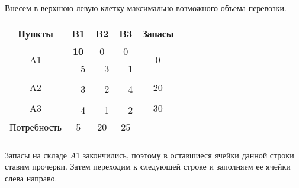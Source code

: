 \documentclass[a4paper,12pt]{article}
\begin{document}
	Внесем в верхнюю левую клетку максимально возможного объема перевозки.
	
	\begin{center}
		\begin{tabular}{cccccccc}
			\hline
			\multicolumn{1}{|c|}{Пункты} & \multicolumn{2}{c|}{B1} & \multicolumn{2}{c|}{B2} & \multicolumn{2}{c|}{B3} & \multicolumn{1}{c|}{Запасы} \\ \hline
			\multicolumn{1}{|c|}{\multirow{2}{*}{A1}} & \multicolumn{2}{c|}{\textbf{10}} & \multicolumn{2}{c|}{0} & \multicolumn{2}{c|}{0} & \multicolumn{1}{c|}{\multirow{2}{*}{0}} \\ \cline{2-7}
			\multicolumn{1}{|c|}{} & \multicolumn{1}{c|}{} & \multicolumn{1}{c|}{5} & \multicolumn{1}{c|}{} & \multicolumn{1}{c|}{3} & \multicolumn{1}{c|}{} & \multicolumn{1}{c|}{1} & \multicolumn{1}{c|}{} \\ \hline
			\multicolumn{1}{|c|}{\multirow{2}{*}{A2}} & \multicolumn{2}{c|}{} & \multicolumn{2}{c|}{} & \multicolumn{2}{c|}{} & \multicolumn{1}{c|}{\multirow{2}{*}{20}} \\ \cline{2-7}
			\multicolumn{1}{|c|}{} & \multicolumn{1}{c|}{} & \multicolumn{1}{c|}{3} & \multicolumn{1}{c|}{} & \multicolumn{1}{c|}{2} & \multicolumn{1}{c|}{} & \multicolumn{1}{c|}{4} & \multicolumn{1}{c|}{} \\ \hline
			\multicolumn{1}{|c|}{\multirow{2}{*}{A3}} & \multicolumn{2}{c|}{} & \multicolumn{2}{c|}{} & \multicolumn{2}{c|}{} & \multicolumn{1}{c|}{\multirow{2}{*}{30}} \\ \cline{2-7}
			\multicolumn{1}{|c|}{} & \multicolumn{1}{c|}{} & \multicolumn{1}{c|}{4} & \multicolumn{1}{c|}{} & \multicolumn{1}{c|}{1} & \multicolumn{1}{c|}{} & \multicolumn{1}{c|}{2} & \multicolumn{1}{c|}{} \\ \hline
			\multicolumn{1}{|c|}{Потребность} & \multicolumn{2}{c|}{5} & \multicolumn{2}{c|}{20} & \multicolumn{2}{c|}{25} &  \\ \cline{1-7}
			\multicolumn{1}{l}{} & \multicolumn{1}{l}{} & \multicolumn{1}{l}{} & \multicolumn{1}{l}{} & \multicolumn{1}{l}{} & \multicolumn{1}{l}{} & \multicolumn{1}{l}{} & \multicolumn{1}{l}{}
		\end{tabular}
	\end{center}

	Запасы на складе $A1$ закончились, поэтому в оставшиеся ячейки данной строки ставим прочерки. Затем переходим к следующей строке и заполняем ее ячейки слева направо.
	
\end{document}
